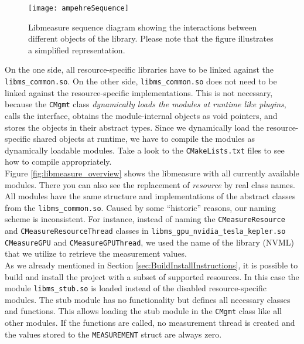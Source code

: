 \begin{figure}
\begin{center}
\texttt{[image: ampehreSequence]} 
\caption{Libmeasure sequence diagram showing the interactions between different objects of the library. Please note that the figure illustrates a simplified representation.}
\label{fig:libmeasureSequence}
\end{center}
\end{figure}

On the one side, all resource-specific libraries have to be linked against the \texttt{libms\_common.so}. On the other side, \texttt{libms\_common.so} does not need to be linked against the resource-specific implementations. This is not necessary, because the \texttt{CMgmt} class \textit{dynamically loads the modules at runtime like plugins}, calls the interface, obtains the module-internal objects as void pointers, and stores the objects in their abstract types. Since we dynamically load the resource-specific shared objects at runtime, we have to compile the modules as dynamically loadable modules. Take a look to the \texttt{CMakeLists.txt} files to see how to compile appropriately.\\

Figure \ref{fig:libmeasure_overview} shows the libmeasure with all currently available modules. There you can also see the replacement of \textit{resource} by real class names. All modules have the same structure and implementations of the abstract classes from the \texttt{libms\_common.so}. Caused by some ``historic'' reasons, our naming scheme is inconsistent. For instance, instead of naming the \texttt{CMeasureResource} and \texttt{CMeasureResourceThread} classes in \texttt{libms\_gpu\_nvidia\_tesla\_kepler.so} \\\texttt{CMeasureGPU} and \texttt{CMeasureGPUThread}, we used the name of the library (NVML) that we utilize to retrieve the measurement values.\\

As we already mentioned in Section \ref{sec:BuildInstallInstructions}, it is possible to build and install the project with a subset of supported resources. In this case the module \texttt{libms\_stub.so} is loaded instead of the disabled resource-specific modules. The stub module has no functionality but defines all necessary classes and functions. This allows loading the stub module in the \texttt{CMgmt} class like all other modules. If the functions are called, no measurement thread is created and the values stored to the \texttt{MEASUREMENT} struct are always zero.

